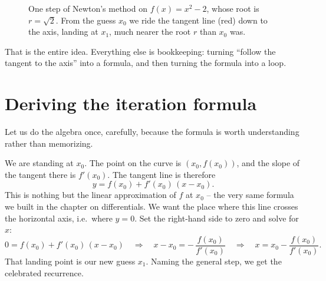 \begin{figure}[H]
\centering
{}
\caption{One step of Newton's method on $f(x)=x^2-2$, whose root is $r=\sqrt2$.
From the guess $x_0$ we ride the tangent line (red) down to the axis, landing at
$x_1$, much nearer the root $r$ than $x_0$ was.}
\label{ch19:fig-onestep}
\end{figure}

That is the entire idea. Everything else is bookkeeping: turning ``follow the
tangent to the axis'' into a formula, and then turning the formula into a loop.

\section{Deriving the iteration formula}
\label{ch19:formula}

Let us do the algebra once, carefully, because the formula is worth understanding
rather than memorizing.

We are standing at $x_0$. The point on the curve is $(x_0, f(x_0))$, and the slope
of the tangent there is $f'(x_0)$. The tangent line is therefore
\[
  y = f(x_0) + f'(x_0)\,(x - x_0).
\]
This is nothing but the linear approximation of $f$ at $x_0$ -- the very same
formula we built in the chapter on differentials. We want the place where this line
crosses the horizontal axis, i.e.\ where $y = 0$. Set the right-hand side to zero
and solve for $x$:
\[
  0 = f(x_0) + f'(x_0)\,(x - x_0)
  \quad\Longrightarrow\quad
  x - x_0 = -\,\frac{f(x_0)}{f'(x_0)}
  \quad\Longrightarrow\quad
  x = x_0 - \frac{f(x_0)}{f'(x_0)}.
\]
That landing point is our new guess $x_1$. Naming the general step, we get the
celebrated recurrence.

